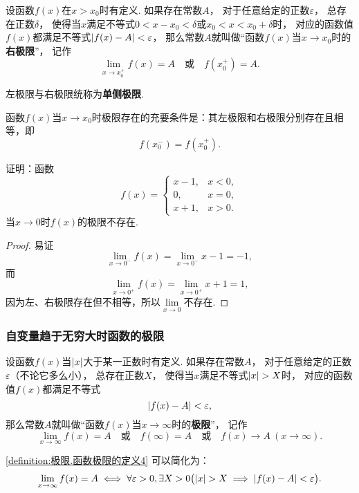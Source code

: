 \begin{definition}\label{definition:极限.函数极限的定义3}
设函数\(f(x)\)在\(x > x_0\)时有定义.
如果存在常数\(A\)，%
对于任意给定的正数\(\varepsilon\)，%
总存在正数\(\delta\)，%
使得当\(x\)满足不等式\(0 < x - x_0 < \delta\)或\(x_0 < x < x_0 + \delta\)时，%
对应的函数值\(f(x)\)都满足不等式\(\abs{f(x) - A} < \varepsilon\)，%
那么常数\(A\)就叫做“函数\(f(x)\)当\(x \to x_0\)时的\textbf{右极限}”，%
记作\[
\lim\limits_{x \to x_0^+} f(x) = A
\quad\text{或}\quad
f(x_0^+) = A.
\]
\end{definition}
左极限与右极限统称为\textbf{单侧极限}.

\begin{theorem}
函数\(f(x)\)当\(x \to x_0\)时极限存在的充要条件是：其左极限和右极限分别存在且相等，即\[
f(x_0^-) = f(x_0^+).
\]
\end{theorem}

\begin{example}
证明：函数\[
f(x) = \left\{ \begin{array}{lc}
x-1, & x<0, \\
0, & x=0, \\
x+1, & x>0.
\end{array} \right.
\]当\(x\to0\)时\(f(x)\)的极限不存在.
\begin{proof}
易证\[
\lim\limits_{x\to0^-} f(x) = \lim\limits_{x\to0^-} x-1 = -1,
\]而\[
\lim\limits_{x\to0^+} f(x) = \lim\limits_{x\to0^+} x+1 = 1,
\]因为左、右极限存在但不相等，所以\(\lim\limits_{x\to0}\)不存在.
\end{proof}
\end{example}

\subsubsection*{自变量趋于无穷大时函数的极限}
\begin{definition}\label{definition:极限.函数极限的定义4}
设函数\(f(x)\)当\(\abs{x}\)大于某一正数时有定义.
如果存在常数\(A\)，%
对于任意给定的正数\(\varepsilon\)（不论它多么小），%
总存在正数\(X\)，%
使得当\(x\)满足不等式\(\abs{x} > X\)时，%
对应的函数值\(f(x)\)都满足不等式\[
\abs{f(x) - A} < \varepsilon,
\]那么常数\(A\)就叫做“函数\(f(x)\)当\(x \to \infty\)时的\textbf{极限}”，%
记作\[
\lim\limits_{x \to \infty} f(x) = A
\quad\text{或}\quad
f(\infty) = A
\quad\text{或}\quad
f(x) \to A\ (x \to \infty).
\]
\end{definition}
\cref{definition:极限.函数极限的定义4} 可以简化为：
\[
\lim\limits_{x\to\infty} f(x) = A
\iff
\forall\varepsilon>0,
\exists X>0
\bigl(
	\abs{x} > X
	\implies
	\abs{f(x) - A} < \varepsilon
\bigr).
\]

